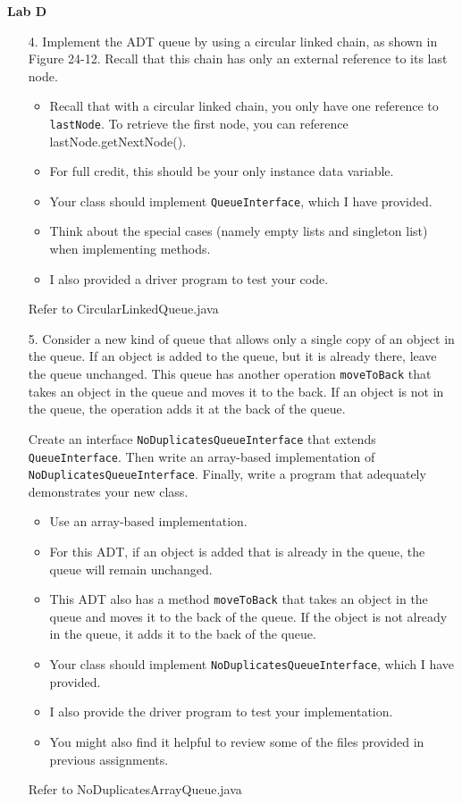 \documentclass[10pt]{article}
\begin{document}
\begin{center}
	\textbf{\large{Lab D}}
\end{center}

\begin{enumerate}
	\item[4.] Implement the ADT queue by using a circular linked chain, as shown in Figure 24-12. Recall that this chain has only an external reference to its last node.
		
		\begin{itemize}
			\item Recall that with a circular linked chain, you only have one reference to \texttt{lastNode}. To retrieve the first node, you can reference lastNode.getNextNode().
			\item For full credit, this should be your only instance data variable.
			\item Your class should implement \texttt{QueueInterface}, which I have provided.
			\item Think about the special cases (namely empty lists and singleton list) when implementing methods.
			\item I also provided a driver program to test your code.
		\end{itemize}
		
		\vspace{0.5cm}
		Refer to CircularLinkedQueue.java
		\vspace{0.5cm}
	
	\item[5.] Consider a new kind of queue that allows only a single copy of an object in the queue. If an object is added to the queue, but it is already there, leave the queue unchanged. This queue has another operation \texttt{moveToBack} that takes an object in the queue and moves it to the back. If an object is not in the queue, the operation adds it at the back of the queue.
	
		\vspace{0.5cm}
		Create an interface \texttt{NoDuplicatesQueueInterface} that extends \texttt{QueueInterface}. Then write an array-based implementation of \texttt{NoDuplicatesQueueInterface}. Finally, write a program that adequately demonstrates your new class.
			
		\begin{itemize}
			\item Use an array-based implementation.
			\item For this ADT, if an object is added that is already in the queue, the queue will remain unchanged.
			\item This ADT also has a method \texttt{moveToBack} that takes an object in the queue and moves it to the back of the queue. If the object is not already in the queue, it adds it to the back of the queue.
			\item Your class should implement \texttt{NoDuplicatesQueueInterface}, which I have provided.
			\item I also provide the driver program to test your implementation.
			\item You might also find it helpful to review some of the files provided in previous assignments.
		\end{itemize}
		
		\vspace{0.5cm}
		Refer to NoDuplicatesArrayQueue.java
		\vspace{0.5cm}
\end{enumerate}
\end{document}
